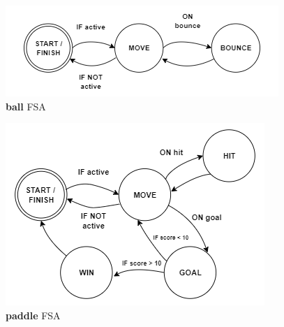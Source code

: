 \documentclass{report}
\newcommand{\pad}{\textbf{paddle}\xspace}
\newcommand{\ball}{\textbf{ball}\xspace}
\begin{document}
\begin{figure}
    \includegraphics[width=\textwidth]{BallFSA.png}
    \caption{\ball FSA}
    \label{fig:ballFSA}
\end{figure}

\begin{figure}
    \includegraphics[width=\textwidth]{PaddleFSA.png}
    \caption{\pad FSA}
    \label{fig:PaddleFSA}
\end{figure}
\end{document}
